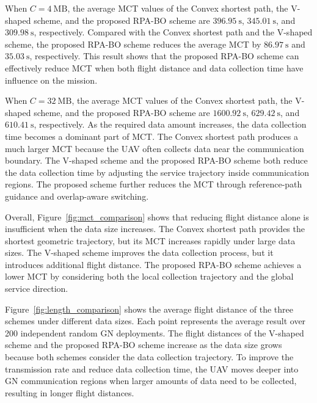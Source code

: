 \documentclass[12pt]{ksthesis}
\begin{document}
\begin{thesis}
{    When \(C=4~\mathrm{MB}\), the average MCT values of the Convex shortest path, the V-shaped scheme, and the proposed RPA-BO scheme are \(396.95~\mathrm{s}\), \(345.01~\mathrm{s}\), and \(309.98~\mathrm{s}\), respectively. Compared with the Convex shortest path and the V-shaped scheme, the proposed RPA-BO scheme reduces the average MCT by \(86.97~\mathrm{s}\) and \(35.03~\mathrm{s}\), respectively. This result shows that the proposed RPA-BO scheme can effectively reduce MCT when both flight distance and data collection time have influence on the mission.

    When \(C=32~\mathrm{MB}\), the average MCT values of the Convex shortest path, the V-shaped scheme, and the proposed RPA-BO scheme are \(1600.92~\mathrm{s}\), \(629.42~\mathrm{s}\), and \(610.41~\mathrm{s}\), respectively. As the required data amount increases, the data collection time becomes a dominant part of MCT. The Convex shortest path produces a much larger MCT because the UAV often collects data near the communication boundary. The V-shaped scheme and the proposed RPA-BO scheme both reduce the data collection time by adjusting the service trajectory inside communication regions. The proposed scheme further reduces the MCT through reference-path guidance and overlap-aware switching.
    
    Overall, Figure~\ref{fig:mct_comparison} shows that reducing flight distance alone is insufficient when the data size increases. The Convex shortest path provides the shortest geometric trajectory, but its MCT increases rapidly under large data sizes. The V-shaped scheme improves the data collection process, but it introduces additional flight distance. The proposed RPA-BO scheme achieves a lower MCT by considering both the local collection trajectory and the global service direction.


    Figure~\ref{fig:length_comparison} shows the average flight distance of the three schemes under different data sizes. Each point represents the average result over 200 independent random GN deployments. The flight distances of the V-shaped scheme and the proposed RPA-BO scheme increase as the data size grows because both schemes consider the data collection trajectory. To improve the transmission rate and reduce data collection time, the UAV moves deeper into GN communication regions when larger amounts of data need to be collected, resulting in longer flight distances.

}
\end{thesis}
\end{document}
